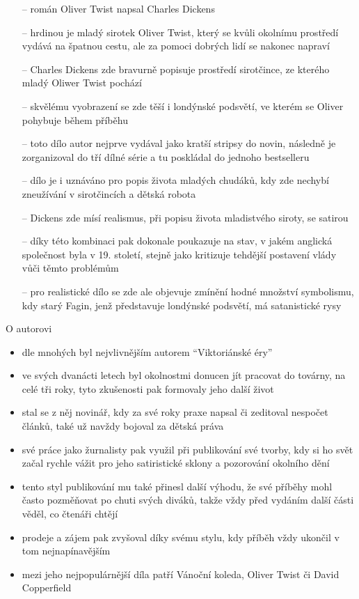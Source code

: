 \documentclass{article}
\begin{document}
\begin{itemize}
    \item [--] román Oliver Twist napsal Charles Dickens
    \item [--] hrdinou je mladý sirotek Oliver Twist, který se kvůli okolnímu prostředí vydává na špatnou cestu, ale za pomoci dobrých lidí se nakonec napraví
    \item [--] Charles Dickens zde bravurně popisuje prostředí sirotčince, ze kterého mladý Oliwer Twist pochází
    \item [--] skvělému vyobrazení se zde těší i londýnské podsvětí, ve kterém se Oliver pohybuje během příběhu
    \item [--] toto dílo autor nejprve vydával jako kratší stripsy do novin, následně je zorganizoval do tří dílné série a tu poskládal do jednoho bestselleru
    \item [--] dílo je i uznáváno pro popis života mladých chudáků, kdy zde nechybí zneužívání v sirotčincích a dětská robota
    \item [--] Dickens zde mísí realismus, při popisu života mladistvého siroty, se satirou
    \item [--] díky této kombinaci pak dokonale poukazuje na stav, v jakém anglická společnost byla v 19. století, stejně jako kritizuje tehdější postavení vlády vůči těmto problémům
    \item [--] pro realistické dílo se zde ale objevuje zmínění hodné množství symbolismu, kdy starý Fagin, jenž představuje londýnské podsvětí, má satanistické rysy
\end{itemize}
\hspace{1em}
{\LARGE
O autorovi
}
\begin{itemize}
    \item dle mnohých byl nejvlivnějším autorem \enquote{Viktoriánské éry}
    \item ve svých dvanácti letech byl okolnostmi donucen jít pracovat do továrny, na celé tři roky, tyto zkušenosti pak formovaly jeho další život
    \item stal se z něj novinář, kdy za své roky praxe napsal či zeditoval nespočet článků, také už navždy bojoval za dětská práva
    \item své práce jako žurnalisty pak využil při publikování své tvorby, kdy si ho svět začal rychle vážit pro jeho satiristické sklony a pozorování okolního dění
    \item tento styl publikování mu také přinesl další výhodu, že své příběhy mohl často pozměňovat po chuti svých diváků, takže vždy před vydáním další části věděl, co čtenáři chtějí
    \item prodeje a zájem pak zvyšoval díky svému stylu, kdy příběh vždy ukončil v tom nejnapínavějším
    \item mezi jeho nejpopulárnější díla patří Vánoční koleda, Oliver Twist či David Copperfield
\end{itemize}
\end{document}
